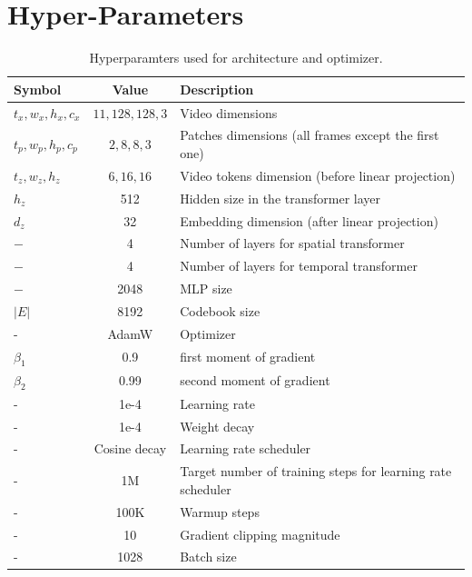 \section{Hyper-Parameters}
\begin{table}[hbtp]
    \centering
    \begin{tabular}{l|c|l}
         Symbol & Value & Description \\\hline
         $t_x, w_x, h_x, c_x$ & $11, 128, 128, 3$ & Video dimensions \\
         $t_p, w_p, h_p, c_p$ & $2, 8, 8, 3$ & Patches dimensions (all frames except the first one) \\
         $t_z, w_z, h_z$ & $6, 16, 16$ & Video tokens dimension (before linear projection) \\
         $h_z$ & 512 & Hidden size in the transformer layer \\
         $d_z$ & 32 & Embedding dimension (after linear projection) \\
         $-$ & 4 & Number of layers for spatial transformer \\
         $-$ & 4 & Number of layers for temporal transformer \\
         $-$ & 2048 & MLP size \\
         $|E|$ & 8192 & Codebook size \\ 
         \hline
         - & AdamW &  Optimizer \\
         $\beta_1$ & 0.9 & first moment of gradient \\
         $\beta_2$ & 0.99 & second moment of gradient \\
         - & 1e-4 & Learning rate \\ 
         - & 1e-4 & Weight decay \\ 
         - & Cosine decay & Learning rate scheduler \\ 
         - & 1M & Target number of training steps for learning rate scheduler \\
         - & 100K & Warmup steps \\
         - & 10 & Gradient clipping magnitude \\
         - & 1028 & Batch size \\
         
    \end{tabular}
    \caption{Hyperparamters used for \cvivit architecture and optimizer.}
    \label{tab:hparams_cvivit}
\end{table}

